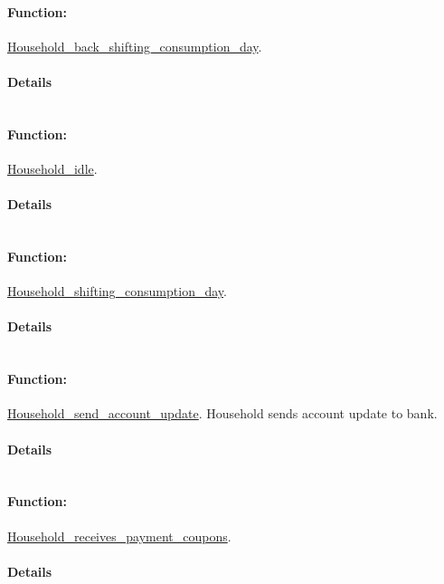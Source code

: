 \documentclass[a4paper,11pt]{article}
\begin{document}
\paragraph{Function:}\url{Household_back_shifting_consumption_day}.

\paragraph{Details}
\begin{verbatim}
\end{verbatim}
\paragraph{Function:}\url{Household_idle}.

\paragraph{Details}
\begin{verbatim}
\end{verbatim}
\paragraph{Function:}\url{Household_shifting_consumption_day}.

\paragraph{Details}
\begin{verbatim}
\end{verbatim}
\paragraph{Function:}\url{Household_send_account_update}.
Household sends account update to bank.
\paragraph{Details}
\begin{verbatim}
\end{verbatim}
\paragraph{Function:}\url{Household_receives_payment_coupons}.

\paragraph{Details}
\begin{verbatim}
\end{verbatim}
\end{document}
